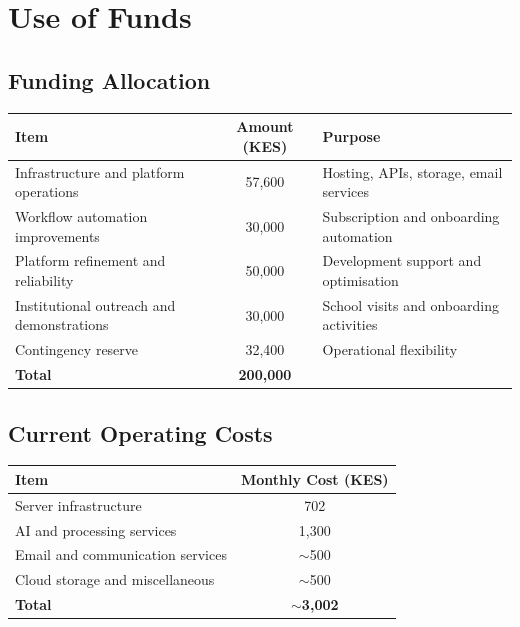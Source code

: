 \documentclass[a4paper,11pt]{article}
\begin{document}
\section{Use of Funds}

\subsection*{Funding Allocation}

\begin{table}[h]
\centering
\begin{tabular}{@{}p{6.5cm} c p{3.5cm}@{}}
\toprule
\rowcolor{indigobg}
\textcolor{indigobrand}{\textbf{Item}} &
\textcolor{indigobrand}{\textbf{Amount (KES)}} &
\textcolor{indigobrand}{\textbf{Purpose}} \\
\midrule
Infrastructure and platform operations   & 57,600  & Hosting, APIs, storage, email services \\
Workflow automation improvements          & 30,000  & Subscription and onboarding automation \\
Platform refinement and reliability       & 50,000  & Development support and optimisation \\
Institutional outreach and demonstrations & 30,000  & School visits and onboarding activities \\
Contingency reserve                       & 32,400  & Operational flexibility \\
\midrule
\textbf{Total} & \textbf{200,000} & \\
\bottomrule
\end{tabular}
\end{table}

\subsection*{Current Operating Costs}

\begin{table}[h]
\centering
\begin{tabular}{@{}p{7cm} c@{}}
\toprule
\rowcolor{indigobg}
\textcolor{indigobrand}{\textbf{Item}} & \textcolor{indigobrand}{\textbf{Monthly Cost (KES)}} \\
\midrule
Server infrastructure                   & 702 \\
AI and processing services              & 1,300 \\
Email and communication services        & $\sim$500 \\
Cloud storage and miscellaneous         & $\sim$500 \\
\midrule
\textbf{Total} & \textbf{$\sim$3,002} \\
\bottomrule
\end{tabular}
\end{table}
\end{document}
